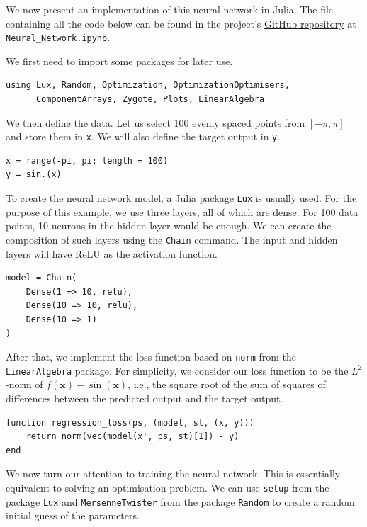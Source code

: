 \documentclass[a4paper,11pt,titlepage]{article}
\theoremstyle{definition}
\theoremstyle{plain}
\theoremstyle{remark}
\begin{document}
We now present an implementation of this neural network in Julia. The file containing all the code below can be found in the project's \href{https://github.com/jaamestaay/M2R-Group-29}{GitHub repository} at \verb|Neural_Network.ipynb|.

We first need to import some packages for later use.

\begin{verbatim}
using Lux, Random, Optimization, OptimizationOptimisers,
      ComponentArrays, Zygote, Plots, LinearAlgebra
\end{verbatim}

We then define the data. Let us select 100 evenly spaced points from $[-\pi, \pi]$ and store them in \verb|x|. We will also define the target output in \verb|y|.

\begin{verbatim}
x = range(-pi, pi; length = 100)
y = sin.(x)
\end{verbatim}

To create the neural network model, a Julia package \verb|Lux| is usually used. For the purpose of this example, we use three layers, all of which are dense. For 100 data points, 10 neurons in the hidden layer would be enough. We can create the composition of such layers using the \verb|Chain| command. The input and hidden layers will have ReLU as the activation function.

\begin{verbatim}
model = Chain(
    Dense(1 => 10, relu),
    Dense(10 => 10, relu),
    Dense(10 => 1)
)
\end{verbatim}

After that, we implement the loss function based on \verb|norm| from the \verb|LinearAlgebra| package. For simplicity, we consider our loss function to be the $L^2$-norm of $f(\mathbf{x}) - \sin (\mathbf{x})$, i.e., the square root of the sum of squares of differences between the predicted output and the target output.

\begin{verbatim}
function regression_loss(ps, (model, st, (x, y)))
    return norm(vec(model(x', ps, st)[1]) - y)
end
\end{verbatim}

We now turn our attention to training the neural network. This is essentially equivalent to solving an optimisation problem. We can use \verb|setup| from the package \verb|Lux| and \verb|MersenneTwister| from the package \verb|Random| to create a random initial guess of the parameters.
\end{document}
